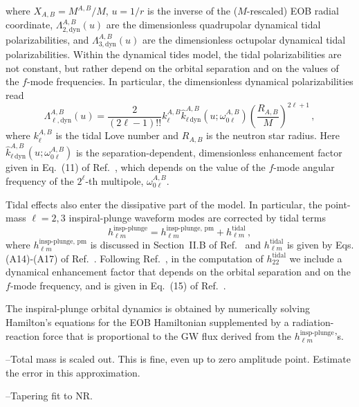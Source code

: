 \documentclass[prd,aps,letter,twocolumn,floatfix,notitlepage]{revtex4-1}
\begin{document}
where $X_{A,B}=M^{A,B}/M$, $u=1/r$ is the inverse of the ($M$-rescaled) EOB radial coordinate, $\Lambda_{2,\textrm{dyn}}^{A,B}(u)$ are the dimensionless quadrupolar dynamical tidal polarizabilities, and $\Lambda_{3,\textrm{dyn}}^{A,B}(u)$ are the dimensionless octupolar dynamical tidal polarizabilities. Within the dynamical tides model, the tidal polarizabilities are not constant, but rather depend on the orbital separation and on the values of the $f$-mode frequencies. In particular, the dimensionless dynamical polarizabilities read
\begin{equation}
\Lambda_{\ell,\textrm{dyn}}^{A,B}(u)=\frac{2}{(2\ell-1)!!}k^{A,B}_{\ell}\hat{k}^{A,B}_{\ell\,\textrm{dyn}}(u;\omega_{0\ell}^{A,B})\left(\frac{R_{A,B}}{M}\right)^{2\ell+1}\,,
\end{equation}
where $k^{A,B}_{\ell}$ is the tidal Love number and $R_{A,B}$ is the neutron star radius. Here $\hat{k}^{A,B}_{\ell\,\textrm{dyn}}(u;\omega_{0\ell}^{A,B})$ is the separation-dependent, dimensionless enhancement factor given in Eq.~(11) of Ref.~\cite{Dietrich:2017feu}, which depends on the value of the $f$-mode angular frequency of the $2^\ell$-th multipole, $\omega_{0\ell}^{A,B}$. 

Tidal effects also enter the dissipative part of the model. In particular, the point-mass $\ell=2,3$ inspiral-plunge waveform modes are corrected by tidal terms
\begin{equation}
h_{\ell m}^{\textrm{insp-plunge}} = h_{\ell m}^{\textrm{insp-plunge, pm}} + h_{\ell m}^{\textrm{tidal}}\,,
\end{equation} 
where $h_{\ell m}^{\textrm{insp-plunge, pm}}$ is discussed in Section~II.B of Ref.~\cite{Bohe:2016gbl} and $h_{\ell m}^{\textrm{tidal}}$ is given by Eqs. (A14)-(A17) of Ref.~\cite{Damour:2012yf}. Following Ref.~\cite{Dietrich:2017feu}, in the computation of $h_{22}^{\textrm{tidal}}$ we include a dynamical enhancement factor that depends on the orbital separation and on the $f$-mode frequency, and is given in Eq.~(15) of Ref.~\cite{Dietrich:2017feu}.

The inspiral-plunge orbital dynamics is obtained by numerically solving Hamilton's equations for the EOB Hamiltonian supplemented by a radiation-reaction force that is proportional to the GW flux derived from the $h_{\ell m}^{\textrm{insp-plunge}}$'s.

--Total mass is scaled out. This is fine, even up to zero amplitude point. Estimate the error in this approximation.

--Tapering fit to NR.
\end{document}
